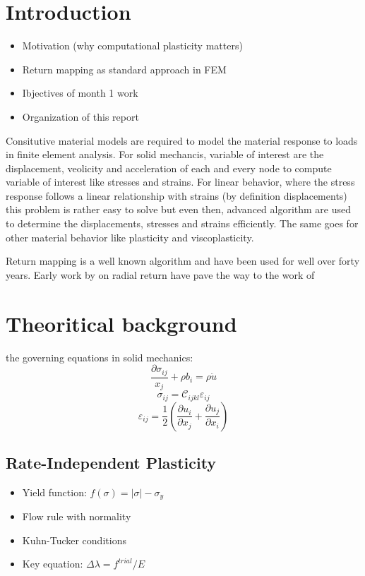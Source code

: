 \documentclass[preprint,12pt]{elsarticle}
\begin{document}

\section{Introduction}
\label{Intro}
\begin{itemize}
  \item Motivation (why computational plasticity matters)
  \item Return mapping as standard approach in FEM
  \item Ibjectives of month 1 work
  \item Organization of this report
\end{itemize}
Consitutive material models are required to model the material response to loads in finite element analysis. For solid mechancis, variable of interest are the displacement, veolicity and acceleration of each and every node to compute variable of interest like stresses and strains. For linear behavior, where the stress response follows a linear relationship with strains (by definition displacements) this problem is rather easy to solve but even then, advanced algorithm are used to determine the displacements, stresses and strains efficiently. The same goes for other material behavior like plasticity and viscoplasticity.

 Return mapping is a well known algorithm and have been used for well over forty years. Early work by \cite{Krieg1977RadialReturn} on radial return have pave the way to the work of \cite{MACrisfield2012}


\section{Theoritical background}
\label{Theoritical background}
the governing equations in solid mechanics:
$$\dfrac{\partial \sigma_{ij}}{x_{j}} + \rho b_{i} = \rho \ddot{u}$$
$$ \sigma_{ij}=\mathcal{C}_{ijkl} \varepsilon_{ij}$$
$$ \varepsilon_{ij}=\dfrac{1}{2} \left(\dfrac{\partial u_{i}}{\partial x_{j}} 
                + \dfrac{\partial u_{j}}{\partial x_{i}} \right) $$

\subsection{Rate-Independent Plasticity}
\label{Rate-Independent Plasticity}
\begin{itemize}
  \item Yield function: $f(\sigma)=|\sigma|-\sigma_{y}$
  \item Flow rule with normality
  \item Kuhn-Tucker conditions
  \item Key equation: $\Delta \lambda = f^{trial} / E$
\end{itemize}
\end{document}
